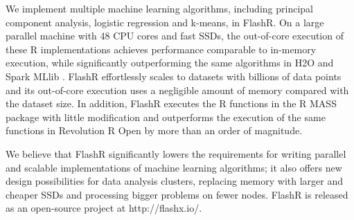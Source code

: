 We implement multiple machine learning algorithms, including principal component
analysis, logistic regression and k-means, in FlashR. On a large parallel machine
with 48 CPU cores and fast SSDs, the out-of-core execution of these R implementations
achieves performance comparable to in-memory execution, while significantly
outperforming the same algorithms in H2O \cite{h2o} and Spark MLlib
\cite{spark}. FlashR effortlessly scales to datasets with billions
of data points and its out-of-core execution uses a negligible amount of memory
compared with the dataset size. In addition, FlashR executes the R functions
in the R MASS \cite{mass} package with little modification and outperforms
the execution of the same functions in Revolution R Open \cite{rro} by more
than an order of magnitude.

We believe that FlashR significantly lowers the requirements for writing
parallel and scalable implementations of machine learning algorithms; it also
offers new
design possibilities for data analysis clusters, replacing memory with larger
and cheaper SSDs and processing bigger problems on fewer nodes.
FlashR is released as an open-source project at http://flashx.io/.
